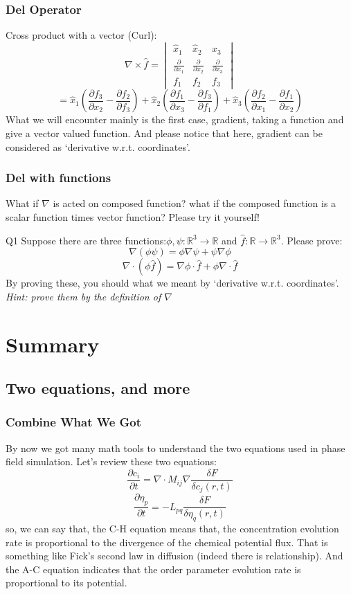 \documentclass[compress]{beamer}
\begin{document}
\begin{frame}
  \frametitle{Del Operator}
  Cross product with a vector (Curl):
  \[\nabla \times \hat{f} = \begin{vmatrix}
      \hat{x}_1                      & \hat{x}_2                      & \hat{x}_3                      \\
      \frac{\partial }{\partial x_1} & \frac{\partial }{\partial x_2} & \frac{\partial }{\partial x_3} \\
      f_1                            & f_2                            & f_3
    \end{vmatrix}
  \]
  \[ = \hat{x}_1\left( \frac{\partial f_3}{\partial x_2}-\frac{\partial f_2}{\partial f_3} \right)
    + \hat{x}_2\left( \frac{\partial f_1}{\partial x_3}-\frac{\partial f_3}{\partial f_1} \right)
    + \hat{x}_3\left( \frac{\partial f_2}{\partial x_1}-\frac{\partial f_1}{\partial x_2} \right)
  \]
  What we will encounter mainly is the first case, gradient, taking a function and give a vector valued function.
  And please notice that here, gradient can be considered as `derivative w.r.t. coordinates'.
\end{frame}
\begin{frame}
  \frametitle{Del with functions}
  What if \(\nabla\) is acted on composed function? what if the composed function is a scalar function times vector function?
  Please try it yourself!
  \begin{block}{Q1}
    Suppose there are three functions:\(\phi,\psi : \mathbb{R}^3 \to \mathbb{R}\) and \(\hat{f} : \mathbb{R} \to \mathbb{R}^3\).
    Please prove:
    \[\nabla\left( \phi\psi \right) = \phi\nabla\psi + \psi\nabla\phi\]
    \[\nabla\cdot\left( \phi\hat{f} \right) = \nabla\phi\cdot\hat{f} + \phi\nabla\cdot\hat{f}\]
    By proving these, you should what we meant by `derivative w.r.t. coordinates'.
    \bigbreak
    \emph{Hint: prove them by the definition of \(\nabla\)}
  \end{block}
\end{frame}


\section{Summary}
\subsection{Two equations, and more}
\begin{frame}
  \frametitle{Combine What We Got}
  By now we got many math tools to understand the two equations used in phase field simulation. Let's review
  these two equations:
  \[
    \frac{\partial c_i}{\partial t} = \nabla \cdot M_{ij} \nabla \frac{\delta F}{\delta c_j \left( r,t \right)} \tag{C-H}
  \]
  \[
    \frac{\partial \eta_p}{\partial t} = -L_{pq}\frac{\delta F}{\delta\eta_q\left( r,t \right)} \tag{A-C}
  \]
  so, we can say that, the C-H equation means that, the concentration evolution rate is proportional to the divergence
  of the chemical potential flux. That is something like Fick's second law in diffusion (indeed there is relationship).
  And the A-C equation indicates that the order parameter evolution rate is proportional to its potential.
\end{frame}
\end{document}
